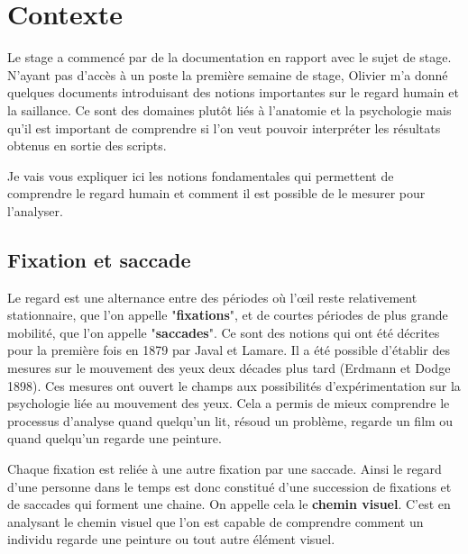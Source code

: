 \chapter{Contexte}
\par
Le stage a commencé par de la documentation en rapport avec le sujet de stage. N'ayant pas d'accès à un poste la première semaine de stage, Olivier m'a donné quelques documents introduisant des notions importantes sur le regard humain et la saillance. Ce sont des domaines plutôt liés à l'anatomie et la psychologie mais qu'il est important de comprendre si l'on veut pouvoir interpréter les résultats obtenus en sortie des scripts.
\par
Je vais vous expliquer ici les notions fondamentales qui permettent de comprendre le regard humain et comment il est possible de le mesurer pour l'analyser.

\section{Fixation et saccade}
\label{section:fix_sacc}
\par
Le regard est une alternance entre des périodes où l'\oe{}il reste relativement stationnaire, que l'on appelle "\textbf{fixations}", et de courtes périodes de plus grande mobilité, que l'on appelle "\textbf{saccades}"\cite{gaze}. Ce sont des notions qui ont été décrites pour la première fois en 1879 par Javal et Lamare. Il a été possible d'établir des mesures sur le mouvement des yeux deux décades plus tard (Erdmann et Dodge 1898). Ces mesures ont ouvert le champs aux possibilités d'expérimentation sur la psychologie liée au mouvement des yeux. Cela a permis de mieux comprendre le processus d'analyse quand quelqu'un lit, résoud un problème, regarde un film ou quand quelqu'un regarde une peinture.

\par
Chaque fixation est reliée à une autre fixation par une saccade. Ainsi le regard d'une personne dans le temps est donc constitué d'une succession de fixations et de saccades qui forment une chaine. On appelle cela le \textbf{chemin visuel}. C'est en analysant le chemin visuel que l'on est capable de comprendre comment un individu regarde une peinture ou tout autre élément visuel.

